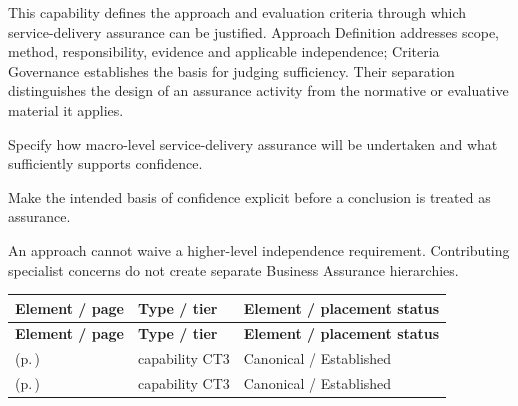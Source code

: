 This capability defines the approach and evaluation criteria through which service-delivery assurance can be justified. Approach Definition addresses scope, method, responsibility, evidence and applicable independence; Criteria Governance establishes the basis for judging sufficiency. Their separation distinguishes the design of an assurance activity from the normative or evaluative material it applies.



Specify how macro-level service-delivery assurance will be undertaken and what sufficiently supports confidence.



Make the intended basis of confidence explicit before a conclusion is treated as assurance.



An approach cannot waive a higher-level independence requirement. Contributing specialist concerns do not create separate Business Assurance hierarchies.


\begingroup\small\setlength{\TableWidth}{\dimexpr\linewidth-6\tabcolsep-4\arrayrulewidth\relax}
\begin{longtable}{|>{\raggedright\arraybackslash}p{0.52\TableWidth}|>{\raggedright\arraybackslash}p{0.2\TableWidth}|>{\raggedright\arraybackslash}p{0.28\TableWidth}|}
\hline\rowcolor{TableHead}\textbf{Element / page} & \textbf{Type / tier} & \textbf{Element / placement status}\\\hline\endfirsthead
\hline\rowcolor{TableHead}\textbf{Element / page} & \textbf{Type / tier} & \textbf{Element / placement status}\\\hline\endhead
\hline\endfoot
\nameref{cap:bc-assurance-approach-definition} (p.\,\pageref{cap:bc-assurance-approach-definition}) & capability CT3 & Canonical / Established\\\hline
\nameref{cap:bc-assurance-evaluation-criteria-governance} (p.\,\pageref{cap:bc-assurance-evaluation-criteria-governance}) & capability CT3 & Canonical / Established\\\hline
\end{longtable}\endgroup

